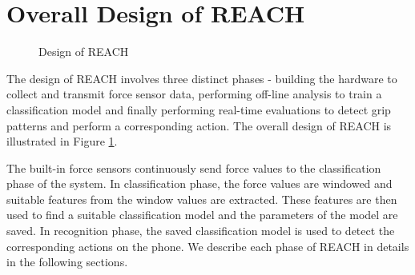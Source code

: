 \section{Overall Design of REACH}

\begin{figure}[h]
\caption{Design of REACH}
\label{fig:Design of REACH}
\end{figure}

The design of REACH involves three distinct phases - building the hardware to collect and transmit force sensor data, performing off-line analysis to train a classification model and finally performing real-time evaluations to detect grip patterns and perform a corresponding action. The overall design of REACH is illustrated in Figure \ref{fig:Design of REACH}.
\par
The built-in force sensors continuously send force values to the classification phase of the system. In classification phase, the force values are windowed and suitable features from the window values are extracted. These features are then used to find a suitable classification model and the parameters of the model are saved. In recognition phase, the saved classification model is used to detect the corresponding actions on the phone. We describe each phase of REACH in details in the following sections.

